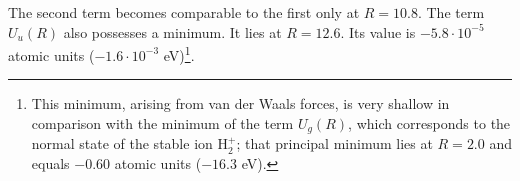 The second term becomes comparable to the first only at $R=10.8$.
The term $U_u(R)$ also possesses a minimum.
It lies at $R=12.6$.
Its value is $-5.8\cdot10^{-5}$ atomic units ($-1.6\cdot10^{-3}$ eV)\footnote{This minimum, arising from van der Waals forces, is very shallow in comparison with the minimum of the term $U_g(R)$, which corresponds to the normal state of the stable ion $\mathrm H_2^+$; that principal minimum lies at $R=2.0$ and equals $-0.60$ atomic units ($-16.3$ eV).}.
